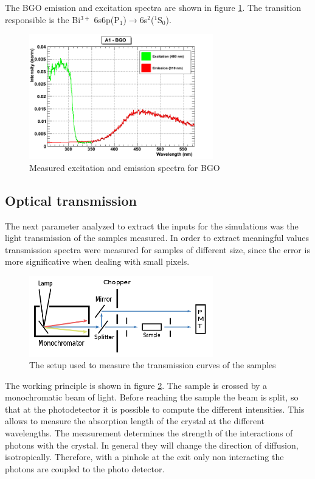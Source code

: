 The BGO emission and excitation spectra are shown in figure \ref{fig:BGO}. The transition responsible is the Bi$^{3+}$ 6s6p(P$_{1}$)$\rightarrow$6s$^{2}$($^{1}$S$_{0}$).

\begin{figure}[htbp]
\begin{center}
\includegraphics[width=8cm]{../Pictures/Chapter_5/BGO.png}
\end{center}
\caption[BGO excitation/emission]{Measured excitation and emission spectra for BGO}
\label{fig:BGO}
\end{figure}

\subsection{Optical transmission}
The next parameter analyzed to extract the inputs for the simulations was the light transmission of the samples measured.
In order to extract meaningful values transmission spectra were measured for samples of different size, since the error is more significative when dealing with small pixels.
\begin{figure}[htbp]
\begin{center}
\includegraphics[width=8cm]{../Pictures/Chapter_5/trans.png}
\end{center}
\caption[Spectro photometer]{The setup used to measure the transmission curves of the samples}
\label{fig:transmission}
\end{figure}
The working principle is shown in figure \ref{fig:transmission}. The sample is crossed by a monochromatic beam of light. Before reaching the sample the beam is split, so that at the photodetector it is possible to compute the different intensities. This allows to measure the absorption length of the crystal at the different wavelengths.
The measurement determines the strength of the interactions of photons with the crystal. In general they will change the direction of diffusion, isotropically. Therefore, with a pinhole at the exit only non interacting the photons are coupled to the photo detector.

